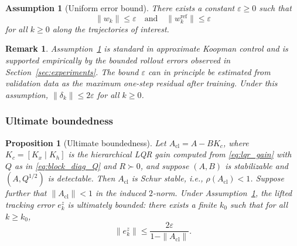 \documentclass[journal]{IEEEtran}
\newtheorem{assumption}{Assumption}
\newtheorem{proposition}{Proposition}
\newtheorem{remark}{Remark}
\begin{document}
\begin{assumption}[Uniform error bound]
\label{assump:bound}
There exists a constant $\varepsilon \geq 0$ such that
\begin{equation}
    \|w_k\| \leq \varepsilon \quad \text{and} \quad \|w_k^{\mathrm{ref}}\| \leq \varepsilon
    \label{eq:error_bound}
\end{equation}
for all $k \geq 0$ along the trajectories of interest.
\end{assumption}

\begin{remark}
Assumption~\ref{assump:bound} is standard in approximate Koopman control \cite{strasser2026overview} and is supported empirically by the bounded rollout errors observed in Section~\ref{sec:experiments}. The bound $\varepsilon$ can in principle be estimated from validation data as the maximum one-step residual after training. Under this assumption, $\|\delta_k\| \leq 2\varepsilon$ for all $k \geq 0$.
\end{remark}

\subsubsection*{Ultimate boundedness}

\begin{proposition}[Ultimate boundedness]
\label{prop:ub}
Let $A_{\mathrm{cl}} = A - BK_c$, where $K_c = [K_x\;|\;K_h]$ is the hierarchical LQR gain computed from \eqref{eq:lqr_gain} with $Q$ as in \eqref{eq:block_diag_Q} and $R \succ 0$, and suppose $(A,B)$ is stabilizable and $(A,Q^{1/2})$ is detectable. Then $A_{\mathrm{cl}}$ is Schur stable, i.e., $\rho(A_{\mathrm{cl}}) < 1$. Suppose further that $\|A_{\mathrm{cl}}\| < 1$ in the induced $2$-norm. Under Assumption~\ref{assump:bound}, the lifted tracking error $e_k^z$ is ultimately bounded: there exists a finite $k_0$ such that for all $k \geq k_0$,
\begin{equation}
    \|e_k^z\| \leq \frac{2\varepsilon}{1 - \|A_{\mathrm{cl}}\|}.
    \label{eq:ub_bound}
\end{equation}
\end{proposition}
\end{document}
